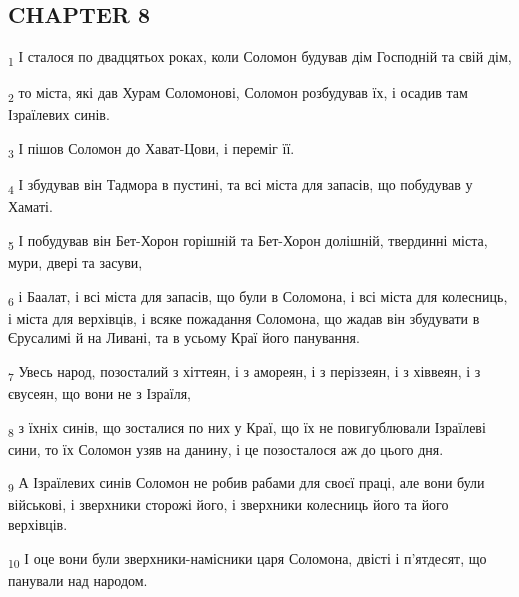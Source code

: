 \subsection{CHAPTER 8}
\begin{tcolorbox}
\textsubscript{1} І сталося по двадцятьох роках, коли Соломон будував дім Господній та свій дім,
\end{tcolorbox}
\begin{tcolorbox}
\textsubscript{2} то міста, які дав Хурам Соломонові, Соломон розбудував їх, і осадив там Ізраїлевих синів.
\end{tcolorbox}
\begin{tcolorbox}
\textsubscript{3} І пішов Соломон до Хават-Цови, і переміг її.
\end{tcolorbox}
\begin{tcolorbox}
\textsubscript{4} І збудував він Тадмора в пустині, та всі міста для запасів, що побудував у Хаматі.
\end{tcolorbox}
\begin{tcolorbox}
\textsubscript{5} І побудував він Бет-Хорон горішній та Бет-Хорон долішній, твердинні міста, мури, двері та засуви,
\end{tcolorbox}
\begin{tcolorbox}
\textsubscript{6} і Баалат, і всі міста для запасів, що були в Соломона, і всі міста для колесниць, і міста для верхівців, і всяке пожадання Соломона, що жадав він збудувати в Єрусалимі й на Ливані, та в усьому Краї його панування.
\end{tcolorbox}
\begin{tcolorbox}
\textsubscript{7} Увесь народ, позосталий з хіттеян, і з амореян, і з періззеян, і з хіввеян, і з євусеян, що вони не з Ізраїля,
\end{tcolorbox}
\begin{tcolorbox}
\textsubscript{8} з їхніх синів, що зосталися по них у Краї, що їх не повигублювали Ізраїлеві сини, то їх Соломон узяв на данину, і це позосталося аж до цього дня.
\end{tcolorbox}
\begin{tcolorbox}
\textsubscript{9} А Ізраїлевих синів Соломон не робив рабами для своєї праці, але вони були військові, і зверхники сторожі його, і зверхники колесниць його та його верхівців.
\end{tcolorbox}
\begin{tcolorbox}
\textsubscript{10} І оце вони були зверхники-намісники царя Соломона, двісті і п'ятдесят, що панували над народом.
\end{tcolorbox}
